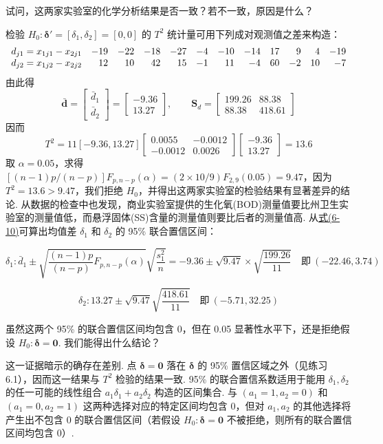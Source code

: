 试问，这两家实验室的化学分析结果是否一致？若不一致，原因是什么？

检验 $H_0: \boldsymbol{\delta}'=[\delta_1,\delta_2]=[0,0]$ 的 $T^2$ 统计量可用下列成对观测值之差来构造：
\[
\begin{array}{l r r r r r r r r r r r}
d_{j1}=x_{1j1}-x_{2j1} & -19 & -22 & -18 & -27 & -4 & -10 & -14 & 17 & 9 & 4 & -19\\
d_{j2}=x_{1j2}-x_{2j2} & 12 & 10 & 42 & 15 & -1 & 11 & -4 & 60 & -2 & 10 & -7
\end{array}
\]
由此得
\[
\bar{\mathbf{d}}=\begin{bmatrix}\bar{d}_1\\\bar{d}_2\end{bmatrix}=\begin{bmatrix}-9.36\\13.27\end{bmatrix},\qquad
\mathbf{S}_d=\begin{bmatrix}199.26&88.38\\88.38&418.61\end{bmatrix}
\]
因而
\[
T^2=11[-9.36,13.27]\begin{bmatrix}0.0055&-0.0012\\-0.0012&0.0026\end{bmatrix}\begin{bmatrix}-9.36\\13.27\end{bmatrix}=13.6
\]
取 $\alpha=0.05$，求得 $[(n-1)p/(n-p)]F_{p,n-p}(\alpha)=(2\times 10/9)F_{2,9}(0.05)=9.47$，因为 $T^2=13.6>9.47$，我们拒绝 $H_0$，并得出这两家实验室的检验结果有显著差异的结论. 从数据的检查中也发现，商业实验室提供的生化氧(BOD)测量值要比州卫生实验室的测量值低，而悬浮固体(SS)含量的测量值则要比后者的测量值高. 从\hyperref[eq:6-10]{式(6-10)}可算出均值差 $\delta_1$ 和 $\delta_2$ 的 95\% 联合置信区间：

\[
\delta_1: \bar{d}_1\pm\sqrt{\frac{(n-1)p}{(n-p)}F_{p,n-p}(\alpha)}\sqrt{\frac{s_1^2}{n}}
=-9.36\pm\sqrt{9.47}\times\sqrt{\frac{199.26}{11}}\quad 即\ (-22.46,3.74)
\]

\[
\delta_2: 13.27\pm\sqrt{9.47}\sqrt{\frac{418.61}{11}}\quad 即\ (-5.71,32.25)
\]

虽然这两个 95\% 的联合置信区间均包含 0，但在 0.05 显著性水平下，还是拒绝假设 $H_0: \boldsymbol{\delta}=\mathbf{0}$. 我们能得出什么结论？

这一证据暗示的确存在差别. 点 $\boldsymbol{\delta}=\mathbf{0}$ 落在 $\boldsymbol{\delta}$ 的 95\% 置信区域之外（见练习 6.1），因而这一结果与 $T^2$ 检验的结果一致. 95\% 的联合置信系数适用于能用 $\delta_1,\delta_2$ 的任一可能的线性组合 $a_1\delta_1+a_2\delta_2$ 构造的区间集合. 与 $(a_1=1,a_2=0)$ 和 $(a_1=0,a_2=1)$ 这两种选择对应的特定区间均包含 0，但对 $a_1,a_2$ 的其他选择将产生出不包含 0 的联合置信区间（若假设 $H_0: \boldsymbol{\delta}=\mathbf{0}$ 不被拒绝，则所有的联合置信区间均包含 0）.

